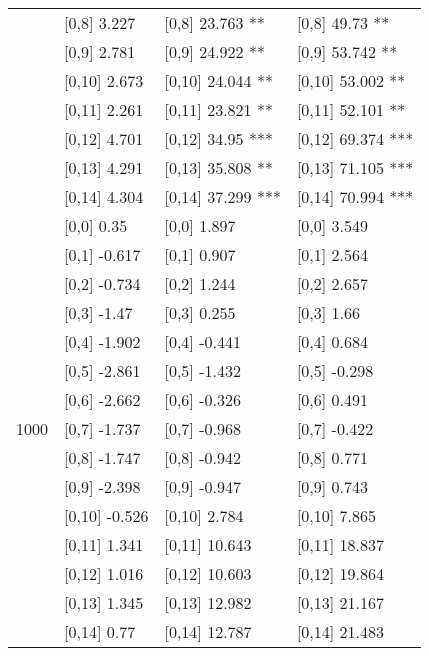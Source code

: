 \begin{table}
\begin{tabular}[t]{llll}
 & {}[0,8] 3.227 & {}[0,8] 23.763 ** & {}[0,8] 49.73 **\\
 & {}[0,9] 2.781 & {}[0,9] 24.922 ** & {}[0,9] 53.742 **\\
\addlinespace
 & {}[0,10] 2.673 & {}[0,10] 24.044 ** & {}[0,10] 53.002 **\\
 & {}[0,11] 2.261 & {}[0,11] 23.821 ** & {}[0,11] 52.101 **\\
 & {}[0,12] 4.701 & {}[0,12] 34.95 *** & {}[0,12] 69.374 ***\\
 & {}[0,13] 4.291 & {}[0,13] 35.808 ** & {}[0,13] 71.105 ***\\
 & {}[0,14] 4.304 & {}[0,14] 37.299 *** & {}[0,14] 70.994 ***\\
\addlinespace
 & {}[0,0] 0.35 & {}[0,0] 1.897 & {}[0,0] 3.549\\
 & {}[0,1] -0.617 & {}[0,1] 0.907 & {}[0,1] 2.564\\
 & {}[0,2] -0.734 & {}[0,2] 1.244 & {}[0,2] 2.657\\
 & {}[0,3] -1.47 & {}[0,3] 0.255 & {}[0,3] 1.66\\
 & {}[0,4] -1.902 & {}[0,4] -0.441 & {}[0,4] 0.684\\
\addlinespace
 & {}[0,5] -2.861 & {}[0,5] -1.432 & {}[0,5] -0.298\\
 & {}[0,6] -2.662 & {}[0,6] -0.326 & {}[0,6] 0.491\\
1000 & {}[0,7] -1.737 & {}[0,7] -0.968 & {}[0,7] -0.422\\
 & {}[0,8] -1.747 & {}[0,8] -0.942 & {}[0,8] 0.771\\
 & {}[0,9] -2.398 & {}[0,9] -0.947 & {}[0,9] 0.743\\
\addlinespace
 & {}[0,10] -0.526 & {}[0,10] 2.784 & {}[0,10] 7.865\\
 & {}[0,11] 1.341 & {}[0,11] 10.643 & {}[0,11] 18.837\\
 & {}[0,12] 1.016 & {}[0,12] 10.603 & {}[0,12] 19.864\\
 & {}[0,13] 1.345 & {}[0,13] 12.982 & {}[0,13] 21.167\\
 & {}[0,14] 0.77 & {}[0,14] 12.787 & {}[0,14] 21.483\\
\bottomrule
\end{tabular}
\end{table}
